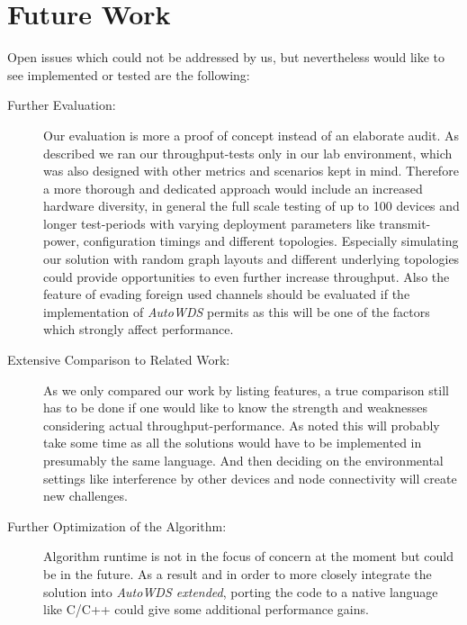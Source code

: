   \section{Future Work}
    Open issues which could not be addressed by us, but nevertheless would like 
    to see implemented or tested are the following:
    \begin{description}
      \item [Further Evaluation:]
	Our evaluation is more a proof of concept instead of an elaborate audit. As described we ran our throughput-tests only in our lab environment, 
	which was also designed with other metrics and scenarios kept in mind.
	Therefore a more thorough and dedicated approach would include an increased hardware diversity, in general the full scale testing of up to 100 devices
	and longer test-periods with varying deployment parameters like transmit-power, configuration timings and different topologies.
	Especially simulating our solution with random graph layouts and different underlying topologies could provide opportunities to even further increase throughput.
	Also the feature of evading foreign used channels should be evaluated if the implementation of
	\textit{AutoWDS} permits as this will be one of the factors which strongly affect performance.
      
      \item[Extensive Comparison to Related Work:]
	As we only compared our work by listing features, a true comparison still has to be done if one would 
	like to know the strength and weaknesses considering actual throughput-performance.
	As noted this will probably take some time as all the solutions would have to be implemented in presumably the same language.
	And then deciding on the environmental settings like interference by other devices and node connectivity will create new challenges.
      
      \item[Further Optimization of the Algorithm:]
	Algorithm runtime is not in the focus of concern at the moment but could be in the future. 
	As a result and in order to more closely integrate the solution into \textit{AutoWDS extended},
	porting the code to a native language like C/C++ could give some additional performance gains.
      

\end{description}
